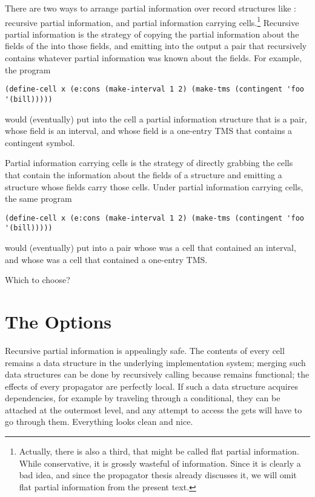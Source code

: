 \documentclass[12pt,letterpaper]{article}
\begin{document}
There are two ways to arrange partial information over record
structures like : recursive partial information, and
partial information carrying cells.\footnote{Actually, there is also a
  third, that might be called flat partial information.  While
  conservative, it is grossly wasteful of information.  Since it is
  clearly a bad idea, and since the propagator thesis already
  discusses it, we will omit flat partial information from the present
  text.}  Recursive partial information is the strategy of copying the
partial information about the fields of the  into those
fields, and emitting into the output a pair that recursively contains
whatever partial information was known about the fields.  For example,
the program
\begin{verbatim}
(define-cell x (e:cons (make-interval 1 2) (make-tms (contingent 'foo '(bill)))))
\end{verbatim}
would (eventually) put into the cell  a partial information
structure that is a pair, whose  field is an interval, and
whose  field is a one-entry TMS that contains a contingent
symbol.

Partial information carrying cells is the strategy of directly
grabbing the cells that contain the information about the fields of a
structure and emitting a structure whose fields carry those cells.
Under partial information carrying cells, the same program
\begin{verbatim}
(define-cell x (e:cons (make-interval 1 2) (make-tms (contingent 'foo '(bill)))))
\end{verbatim}
would (eventually) put into  a pair whose  was a
cell that contained an interval, and whose  was a cell that
contained a one-entry TMS.

Which to choose?

\section{The Options}

Recursive partial information is appealingly safe.  The contents of
every cell remains a data structure in the underlying implementation
system; merging such data structures can be done by recursively
calling  because  remains functional; the
effects of every propagator are perfectly local.  If such a data
structure acquires dependencies, for example by traveling through a
conditional, they can be attached at the outermost level, and any
attempt to access the gets will have to go through them.  Everything
looks clean and nice.
\end{document}
